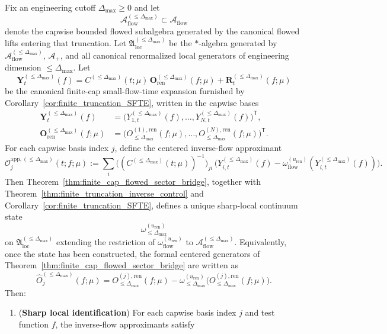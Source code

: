 \begin{theorem}
Fix an engineering cutoff $\Delta_{\max}\ge 0$ and let
\[
\mathcal A_{\mathrm{flow}}^{(\le \Delta_{\max})}\subset\mathcal A_{\mathrm{flow}}
\]
denote the capwise bounded flowed subalgebra generated by the canonical flowed lifts entering that truncation.
Let $\mathfrak A_{\mathrm{loc}}^{(\le \Delta_{\max})}$ be the $\ast$-algebra generated by $\mathcal A_{\mathrm{flow}}^{(\le \Delta_{\max})}$, $\mathcal A_+$, and all canonical renormalized local generators of engineering dimension $\le \Delta_{\max}$.
Let
\[
\mathbf Y_t^{(\le \Delta_{\max})}(f)
=
C^{(\le \Delta_{\max})}(t;\mu)\,\mathbf O_{\mathrm{ren}}^{(\le \Delta_{\max})}(f;\mu)
+\mathbf R_t^{(\le \Delta_{\max})}(f;\mu)
\]
be the canonical finite-cap small-flow-time expansion furnished by Corollary~\ref{cor:finite_truncation_SFTE}, written in the capwise bases
\[
\begin{aligned}
\mathbf Y_t^{(\le \Delta_{\max})}(f)
&=\bigl(Y_{1,t}^{(\le \Delta_{\max})}(f),\dots,Y_{N,t}^{(\le \Delta_{\max})}(f)\bigr)^{\mathsf T},\\
\mathbf O_{\mathrm{ren}}^{(\le \Delta_{\max})}(f;\mu)
&=\bigl(O^{(1),\mathrm{ren}}_{\le \Delta_{\max}}(f;\mu),\dots,O^{(N),\mathrm{ren}}_{\le \Delta_{\max}}(f;\mu)\bigr)^{\mathsf T}.
\end{aligned}
\]
For each capwise basis index $j$, define the centered inverse-flow approximant
\[
\mathcal O^{\mathrm{app},(\le \Delta_{\max})}_{j}(t;f;\mu)
:=
\sum_i \big((C^{(\le \Delta_{\max})}(t;\mu))^{-1}\big)_{ji}\,
\big(Y^{(\le \Delta_{\max})}_{i,t}(f)-\omega_{\mathrm{flow}}^{(u_{\mathrm{ren}})}(Y^{(\le \Delta_{\max})}_{i,t}(f))\big).
\]
Then Theorem~\ref{thm:finite_cap_flowed_sector_bridge}, together with
Theorem~\ref{thm:finite_truncation_inverse_control} and Corollary~\ref{cor:finite_truncation_SFTE}, defines a unique sharp-local continuum state
\[
\omega_{\le \Delta_{\max}}^{(u_{\mathrm{ren}})}
\]
on $\mathfrak A_{\mathrm{loc}}^{(\le \Delta_{\max})}$ extending the restriction of $\omega_{\mathrm{flow}}^{(u_{\mathrm{ren}})}$ to $\mathcal A_{\mathrm{flow}}^{(\le \Delta_{\max})}$.
Equivalently, once the state has been constructed, the formal centered generators of Theorem~\ref{thm:finite_cap_flowed_sector_bridge} are written as
\[
\widehat O_j^{(\le \Delta_{\max})}(f;\mu)
=
O^{(j),\mathrm{ren}}_{\le \Delta_{\max}}(f;\mu)
-\omega_{\le \Delta_{\max}}^{(u_{\mathrm{ren}})}\big(O^{(j),\mathrm{ren}}_{\le \Delta_{\max}}(f;\mu)\big).
\]
Then:
\begin{enumerate}[label=(\alph*)]
\item (\textbf{Sharp local identification}) For each capwise basis index $j$ and test function $f$, the inverse-flow approximants satisfy

\end{enumerate}
\end{theorem}
